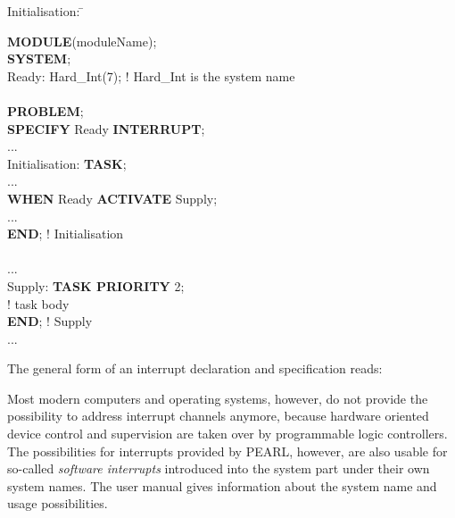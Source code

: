 \begin{tabbing}
Initialisation: \= \kill

{\bf MODULE}(moduleName); \> \\
{\bf SYSTEM}; \> \\
\x Ready: Hard\_Int(7); ! Hard\_Int is the system name \> \\
   \> \\
{\bf PROBLEM}; \> \\
{\bf SPECIFY} Ready {\bf INTERRUPT}; \> \\
... \> \\
Initialisation: \> {\bf TASK}; \\
  \> ... \\
  \> {\bf WHEN} Ready {\bf ACTIVATE} Supply; \\
  \> ... \\
  \> {\bf END}; ! Initialisation \\
  \> \\
...             \> \\
Supply:         \> {\bf TASK PRIORITY} 2;\\
  \> ! task body \\
  \> {\bf END}; ! Supply \\
...             \>
\end{tabbing}

The general form of an interrupt declaration and specification reads:





Most modern computers and operating systems, however, do not provide the
possibility to address interrupt channels anymore, because hardware
oriented device control and supervision are taken over by programmable
logic controllers. The possibilities for interrupts provided by PEARL,
however, are also usable for so-called {\em software interrupts}
introduced into the system part under their own system names. The user manual
gives information about the system name and usage possibilities.

